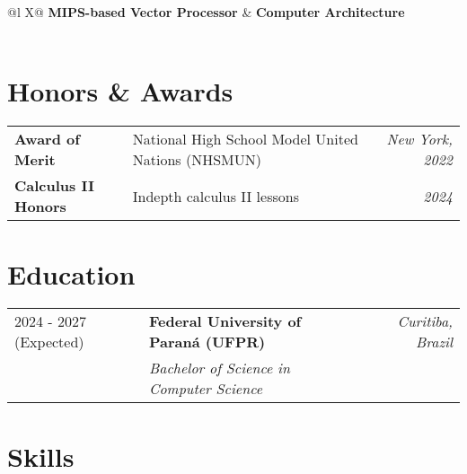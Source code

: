 \documentclass[a4paper,12pt]{article}
\begin{document}
\vspace{0.5em} %

\begin{tabularx}{\linewidth}{@{}l X@{}}
\textbf{MIPS-based Vector Processor} & \hfill \textbf{Computer Architecture} \\
 \\
\end{tabularx}

\section{Honors \& Awards}

\begin{tabularx}{\linewidth}{@{}l X r@{}}
\textbf{Award of Merit} & National High School Model United Nations (NHSMUN) & \textit{New York, 2022} \\
\textbf{Calculus II Honors} & Indepth calculus II lessons & \textit{2024} \\
\end{tabularx}

\section{Education}

\begin{tabularx}{\linewidth}{@{}l X r@{}}
2024 - 2027 (Expected) & \textbf{Federal University of Paraná (UFPR)} & \textit{Curitiba, Brazil} \\
& \textit{Bachelor of Science in Computer Science} & \\
\end{tabularx}

\section{Skills}
\end{document}

